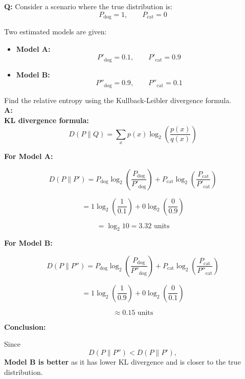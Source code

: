 \documentclass[11pt,a4paper]{book}
\newcounter{qna}[chapter]
\renewcommand{\theqna}{\thechapter.\arabic{qna}}
\newenvironment{questionanswerbox}{
    \refstepcounter{qna}%
    \begin{tcolorbox}[
        enhanced,
        breakable,
        colback=softlavender!10,
        colframe=softlavender!200,
        title={Example~\theqna}, %
        fonttitle=\bfseries,
        coltitle=white,
        colbacktitle=softlavender!200,
        sharp corners,
        boxrule=1pt,
        left=8pt,
        right=8pt,
        top=6pt,
        bottom=6pt
    ]
}{
    \end{tcolorbox}
}
\begin{document}
\begin{questionanswerbox}
\textbf{Q:} Consider a scenario where the true distribution is:
\[
P_{\text{dog}} = 1, \qquad P_{\text{cat}} = 0
\]

Two estimated models are given:

\begin{itemize}
    \item \textbf{Model A:}
    \[
        P'_{\text{dog}} = 0.1, \qquad P'_{\text{cat}} = 0.9
    \]

    \item \textbf{Model B:}
    \[
        P''_{\text{dog}} = 0.9, \qquad P''_{\text{cat}} = 0.1
    \]
\end{itemize}

Find the relative entropy using the Kullback-Leibler divergence formula.\\

\textbf{A:}
\medskip\\
\textbf{KL divergence formula:}
\[
D(P\|Q) = \sum_x p(x)\log_2\!\left(\frac{p(x)}{q(x)}\right)
\]

\textbf{For Model A:}

\[
D(P\|P') 
= P_{\text{dog}}\log_2\!\left(\frac{P_{\text{dog}}}{P'_{\text{dog}}}\right)
+ P_{\text{cat}}\log_2\!\left(\frac{P_{\text{cat}}}{P'_{\text{cat}}}\right)
\]

\[
= 1\log_2\!\left(\frac{1}{0.1}\right)
+ 0\log_2\!\left(\frac{0}{0.9}\right)
\]

\[
= \log_2 10
= 3.32 \text{ units}
\]

\textbf{For Model B:}

\[
D(P\|P'') 
= P_{\text{dog}}\log_2\!\left(\frac{P_{\text{dog}}}{P''_{\text{dog}}}\right)
+ P_{\text{cat}}\log_2\!\left(\frac{P_{\text{cat}}}{P''_{\text{cat}}}\right)
\]

\[
= 1\log_2\!\left(\frac{1}{0.9}\right)
+ 0\log_2\!\left(\frac{0}{0.1}\right)
\]

\[
\approx 0.15 \text{ units}
\]

\textbf{Conclusion:}

Since
\[
D(P\|P'') < D(P\|P'),
\]
\textbf{Model B is better} as it has lower KL divergence and is closer to the true distribution.
\end{questionanswerbox}
\end{document}
